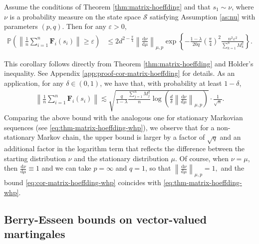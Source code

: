 \medskip
\begin{customcorollary}\label{cor:matrix-hoeffding} 
Assume the conditions of Theorem \ref{thm:matrix-hoeffding}  and that $s_1 \sim \nu$, where $\nu$ is a probability measure on the state space $\mathcal{S}$ satisfying Assumption \ref{as:nu} with parameters $(p,q)$. 
Then for any $\varepsilon>0$, 
\begin{align*}
\mathbb{P}\left(\left\|\frac{1}{n}\sum_{i=1}^n \bm{F}_i(s_i)\right\| \geq \varepsilon \right) &\leq 2d^{2-\frac{\pi}{4}} \left\|\frac{\mathrm{d}\nu}{\mathrm{d}\mu}\right\|_{\mu,p}  \exp\left\{-\frac{1-\lambda}{20q}\left(\frac{\pi}{4}\right)^2\frac{n^2\varepsilon^2 }{\sum_{k=1}^n M_k^2} \right\}.
\end{align*}
\end{customcorollary}
\medskip
This corollary follows directly from Theorem \ref{thm:matrix-hoeffding} and Holder's inequality. See Appendix \ref{app:proof-cor-matrix-hoeffding} for details. As an application, for any $\delta \in (0,1)$, we have that, with probability at least $1-\delta$,
\begin{align}\label{eq:cor-matrix-hoeffding-whp}
\left\|\frac{1}{n}\sum_{i=1}^n \bm{F}_i(s_i)\right\|  \lesssim \sqrt{\frac{q}{1-\lambda} \frac{\sum_{j=1}^n M_j^2}{n} \log \left(\frac{d}{\delta}\left\|\frac{\mathrm{d}\nu}{\mathrm{d}\mu}\right\|_{\mu,p}\right)} \cdot \frac{1}{\sqrt{n}}.
\end{align}
Comparing the above bound with the analogous one for stationary Markovian sequences (see  \ref{eq:thm-matrix-hoeffding-whp}), we observe that for a non-stationary Markov chain, the upper bound is larger by a factor of $\sqrt{q}$ and an additional factor in the logarithm term that reflects the difference between the starting distribution $\nu$ and the stationary distribution $\mu$. Of course, when $\nu = \mu$, then $\frac{\mathrm{d}\nu}{\mathrm{d}\mu} \equiv 1$ and we can take $p = \infty$ and $q = 1$, so that 
$\left\|\frac{\mathrm{d}\nu}{\mathrm{d}\mu}\right\|_{\mu,p} = 1,$
and the bound \eqref{eq:cor-matrix-hoeffding-whp} coincides with \eqref{eq:thm-matrix-hoeffding-whp}.




\subsection{Berry-Esseen bounds on vector-valued martingales}
\label{sec:MC-Berry-Esseen}

